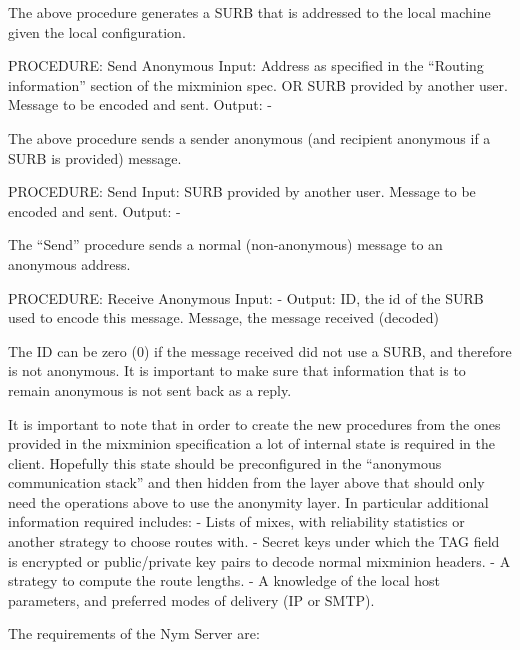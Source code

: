 The above procedure generates a SURB that is addressed to the local
machine given the local configuration.

PROCEDURE: Send Anonymous
Input: Address as specified in the ``Routing information'' section of
	the mixminion spec.
       OR 
       SURB provided by another user.
       Message to be encoded and sent.
Output: -

The above procedure sends a sender anonymous (and recipient anonymous
if a SURB is provided) message.

PROCEDURE: Send
Input: SURB provided by another user.
       Message to be encoded and sent.
Output: -

The ``Send'' procedure sends a normal (non-anonymous) message to an
anonymous address.

PROCEDURE: Receive Anonymous 
Input: -
Output: ID, the id of the SURB used to encode this message.
	Message, the message received (decoded)

The ID can be zero (0) if the message received did not use a SURB, and
therefore is not anonymous. It is important to make sure that
information that is to remain anonymous is not sent back as a reply.

It is important to note that in order to create the new procedures
from the ones provided in the mixminion specification a lot of
internal state is required in the client. Hopefully this state should
be preconfigured in the ``anonymous communication stack'' and then
hidden from the layer above that should only need the operations above
to use the anonymity layer. In particular additional information
required includes:
- Lists of mixes, with reliability statistics or another strategy to
choose routes with.
- Secret keys under which the TAG field is encrypted or public/private
key pairs to decode normal mixminion headers.
- A strategy to compute the route lengths.
- A knowledge of the local host parameters, and preferred modes of
delivery (IP or SMTP).


The requirements of the Nym Server are:

